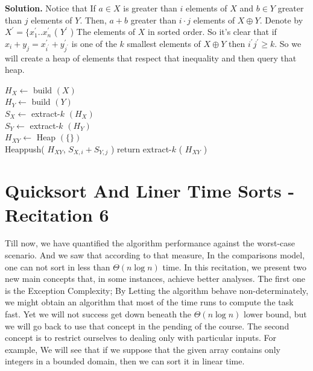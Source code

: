 \textbf{Solution.} Notice that If $a \in X$ is greater than $i$ elements of $X$ and $b \in Y$ greater than $j$ elements of $Y$. Then, $a + b$  greater than $i\cdot j$ elements of $X \oplus Y$. Denote by $X^\prime = \{ x^{\prime}_{1} .. x^{\prime}_{n}$ ( $Y^{\prime}$ ) The elements of $X$ in sorted order. So it's clear that if $x_{i}+y_{j} = x^{\prime}_{i^{\prime}} + y^{\prime}_{j^{\prime}}$ is one of the $k$ smallest elements of $X\oplus Y$ then $i^{\prime}j^{\prime} \ge k$. So we will create a heap of elements that respect that inequality and then query that heap.


\begin{algorithm}[H]
$ H_{X} \leftarrow $ build $\left( X \right)$  \\ 
$ H_{Y} \leftarrow $ build $\left( Y \right)$  \\
$ S_{X} \leftarrow $ extract-$k$ $\left( H_{X} \right)$  \\ 
$ S_{Y} \leftarrow $ extract-$k$ $\left( H_{Y} \right)$  \\
$ H_{XY} \leftarrow $ Heap $(\{ \} )$ \\
 {
   {
  	Heappush( $H_{XY}$, $S_{X,i} + S_{Y, j}$ )    
  }
}
return extract-$k$ ( $H_{XY}$ ) 
\end{algorithm}

\fi



\chapter{Quicksort And Liner Time Sorts  - Recitation 6} 
\author{Quicksort, Countingsort, Radixsort, And Bucketsort.}


Till now, we have quantified the algorithm performance against the worst-case scenario. And we saw that according to that measure, In the comparisons model, one can not sort in less than $\Theta\left( n\log n \right) $ time. In this recitation, we present two new main concepts that, in some instances, achieve better analyses. The first one is the Exception Complexity; By Letting the algorithm behave non-determinately, we might obtain an algorithm that most of the time runs to compute the task fast. Yet we will not success get down beneath the $\Theta\left(n\log n\right)$ lower bound, but we will go back to use that concept in the pending of the course. The second concept is to restrict ourselves to dealing only with particular inputs. For example, We will see that if we suppose that the given array contains only integers in a bounded domain, then we can sort it in linear time.  


